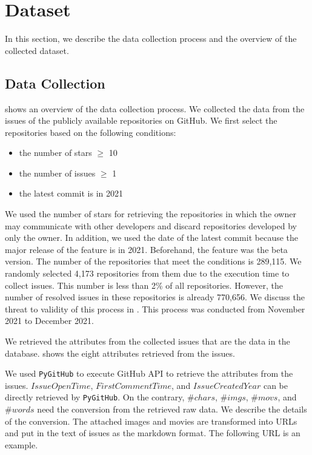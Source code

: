 \section{Dataset}
\label{sec:dataset}

In this section, we describe the data collection process and 
the overview of the collected dataset. 



\subsection{Data Collection}
 shows
an overview of the data collection process.
We collected the data from the issues of 
the publicly available repositories on GitHub. 
We first select the repositories based on the following conditions:
\begin{itemize}
	\item the number of stars $\geq$ 10
	\item the number of issues $\geq$ 1
	\item the latest commit is in 2021
\end{itemize}
We used the number of stars for retrieving the repositories 
in which the owner may communicate with other developers and 
discard repositories developed by only the owner. 
In addition, we used the date of the latest commit 
because the major release of the feature is in 2021. 
Beforehand, the feature was the beta version. 
The number of the repositories that meet 
the conditions is 289,115. 
We randomly selected 4,173 repositories from them 
due to the execution time to collect issues. 
This number is less than 2\% of all repositories. 
However, the number of resolved issues 
in these repositories is already 770,656. 
We discuss the threat to validity of 
this process in . 
This process was conducted from November 2021 to December 2021.



We retrieved the attributes from the collected issues 
that are the data in the database. 
 shows the eight attributes 
retrieved from the issues. 

We used \texttt{PyGitHub} to execute GitHub API 
to retrieve the attributes from the issues. 
$IssueOpenTime$, $FirstCommentTime$,
and $IssueCreatedYear$ can be directly
retrieved by \texttt{PyGitHub}.
On the contrary,
$\#chars$, $\#imgs$, $\#movs$, and $\#words$
need the conversion from the retrieved raw data.
We describe the details of the conversion. 
The attached images and movies are transformed into 
URLs and put in the text of issues as the markdown format. 
The following URL is an example.


